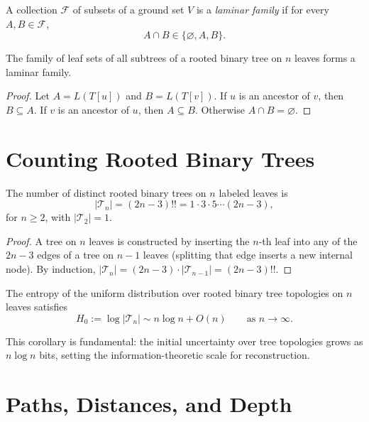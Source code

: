 \begin{definition}
A collection $\mathcal{F}$ of subsets of a ground set $V$ is a \emph{laminar family} if for every $A, B \in \mathcal{F}$,
\[
A \cap B \in \{\varnothing, A, B\}.
\]
\end{definition}

\begin{proposition}
The family of leaf sets of all subtrees of a rooted binary tree on $n$ leaves forms a laminar family.
\end{proposition}

\begin{proof}
Let $A = L(T[u])$ and $B = L(T[v])$. If $u$ is an ancestor of $v$, then $B \subseteq A$. If $v$ is an ancestor of $u$, then $A \subseteq B$. Otherwise $A \cap B = \varnothing$.
\end{proof}

\section{Counting Rooted Binary Trees}

\begin{theorem}
\label{thm:tree_count}
The number of distinct rooted binary trees on $n$ labeled leaves is
\[
|\mathcal{T}_n| = (2n - 3)!! = 1 \cdot 3 \cdot 5 \cdots (2n-3),
\]
for $n \geq 2$, with $|\mathcal{T}_2| = 1$.
\end{theorem}

\begin{proof}
A tree on $n$ leaves is constructed by inserting the $n$-th leaf into any of the $2n-3$ edges of a tree on $n-1$ leaves (splitting that edge inserts a new internal node). By induction, $|\mathcal{T}_n| = (2n-3) \cdot |\mathcal{T}_{n-1}| = (2n-3)!!$.
\end{proof}

\begin{corollary}
\label{cor:tree_entropy}
The entropy of the uniform distribution over rooted binary tree topologies on $n$ leaves satisfies
\[
H_0 := \log |\mathcal{T}_n| \sim n \log n + O(n) \qquad \text{as } n \to \infty.
\]
\end{corollary}

This corollary is fundamental: the initial uncertainty over tree topologies grows as $n \log n$ bits, setting the information-theoretic scale for reconstruction.

\section{Paths, Distances, and Depth}


